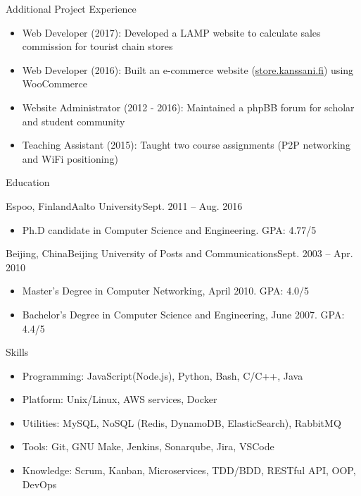 \documentclass[print]{mcdowellcv}
\begin{document}
	\begin{cvsection}{Additional Project Experience}
		\begin{cvsubsection}{}{}{}	
			\begin{itemize}
				\item Web Developer (2017): Developed a LAMP website to calculate sales commission for tourist chain stores
				\item Web Developer (2016): Built an e-commerce website (\url{store.kanssani.fi}) using WooCommerce
				\item Website Administrator (2012 - 2016): Maintained a phpBB forum for scholar and student community
				\item Teaching Assistant (2015): Taught two course assignments (P2P networking and WiFi positioning)
			\end{itemize}
		\end{cvsubsection}
	\end{cvsection}
	
	\begin{cvsection}{Education}
		\begin{cvsubsection}{Espoo, Finland}{Aalto University}{Sept. 2011 -- Aug. 2016}
			\begin{itemize}
				\item Ph.D candidate in Computer Science and Engineering. GPA: 4.77/5
			\end{itemize}
		\end{cvsubsection}

		\begin{cvsubsection}[2]{Beijing, China}{Beijing University of Posts and Communications}{Sept. 2003 --  Apr. 2010}
			\begin{itemize}
				\item Master's Degree in Computer Networking, April 2010. GPA: 4.0/5				 
				\item Bachelor's Degree in Computer Science and Engineering, June 2007. GPA: 4.4/5
			\end{itemize}
		\end{cvsubsection}
	\end{cvsection}
	
	\begin{cvsection}{Skills}
		\begin{cvsubsection}{}{}{}	
			\begin{itemize}
				\item Programming: JavaScript(Node.js), Python, Bash, C/C++, Java
				\item Platform: Unix/Linux, AWS services, Docker
				\item Utilities: MySQL, NoSQL (Redis, DynamoDB, ElasticSearch), RabbitMQ
				\item Tools: Git, GNU Make, Jenkins, Sonarqube, Jira, VSCode
				\item Knowledge: Scrum, Kanban, Microservices, TDD/BDD, RESTful API, OOP, DevOps
			\end{itemize}
		\end{cvsubsection}
	\end{cvsection}
\end{document}
